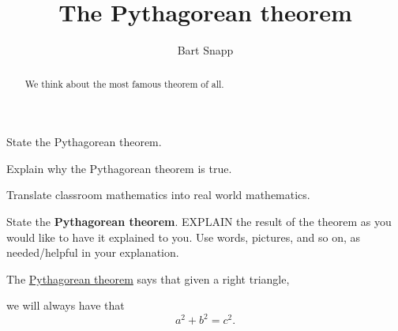 \documentclass[noauthor,nooutcomes,handout,12pt]{ximera}
\title{The Pythagorean theorem}
\author{Bart Snapp}
\begin{document}
\begin{abstract}
  We think about the most famous theorem of all.
\end{abstract}
\maketitle


\begin{listOutcomes}
\item{State the Pythagorean theorem.}
\item{Explain why the Pythagorean theorem is true.}
\item{Translate classroom mathematics into real world mathematics.}
\end{listOutcomes}
\mynewpage

\begin{question}
  State the \textbf{Pythagorean theorem}. EXPLAIN the result of the theorem as
  you would like to have it explained to you.  Use words, pictures,
  and so on, as needed/helpful in your explanation.
  \begin{freeResponse}
    The \underline{Pythagorean theorem} says that given a right
    triangle,
    \begin{center}
    \end{center}
    we will always have that
    \[
    a^2 + b^2 = c^2.
    \]
  \end{freeResponse}
\end{question}
\mynewpage
\end{document}
